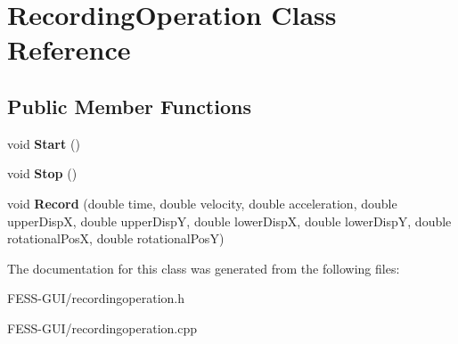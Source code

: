 \hypertarget{class_recording_operation}{}\section{Recording\+Operation Class Reference}
\label{class_recording_operation}
\subsection*{Public Member Functions}
\begin{DoxyCompactItemize}
\item 
\hypertarget{class_recording_operation_a9de73122788d5da0a2d747ae73df9bdf}{}\label{class_recording_operation_a9de73122788d5da0a2d747ae73df9bdf} 
void {\bfseries Start} ()
\item 
\hypertarget{class_recording_operation_afa9953a7cdce60344d090eb95a4d0d13}{}\label{class_recording_operation_afa9953a7cdce60344d090eb95a4d0d13} 
void {\bfseries Stop} ()
\item 
\hypertarget{class_recording_operation_a1a341c41178b05e95bc434510dfeedca}{}\label{class_recording_operation_a1a341c41178b05e95bc434510dfeedca} 
void {\bfseries Record} (double time, double velocity, double acceleration, double upper\+DispX, double upper\+DispY, double lower\+DispX, double lower\+DispY, double rotational\+PosX, double rotational\+PosY)
\end{DoxyCompactItemize}


The documentation for this class was generated from the following files\+:\begin{DoxyCompactItemize}
\item 
F\+E\+S\+S-\/\+G\+U\+I/recordingoperation.\+h\item 
F\+E\+S\+S-\/\+G\+U\+I/recordingoperation.\+cpp\end{DoxyCompactItemize}
